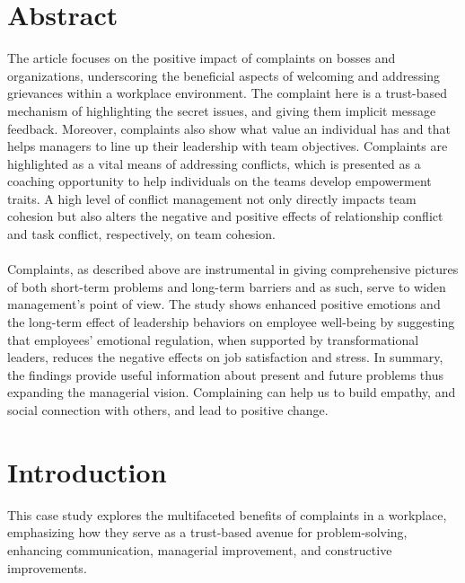 \documentclass[a4paper,12pt]{article}
\begin{document}
\section*{Abstract}
The article focuses on the positive impact of complaints on bosses and organizations, underscoring the beneficial aspects of welcoming and addressing grievances within a workplace environment. The complaint here is a trust-based mechanism of highlighting the secret issues, and giving them implicit message feedback. Moreover, complaints also show what value an individual has and that helps managers to line up their leadership with team objectives. Complaints are highlighted as a vital means of addressing conflicts, which is presented as a coaching opportunity to help individuals on the teams develop empowerment traits. A high level of conflict management not only directly impacts team cohesion but also alters the negative and positive effects of relationship conflict and task conflict, respectively, on team cohesion.
\\\\
Complaints, as described above are instrumental in giving comprehensive pictures of both short-term problems and long-term barriers and as such, serve to widen management's point of view. The study shows enhanced positive emotions and the long-term effect of leadership behaviors on employee well-being by suggesting that employees' emotional regulation, when supported by transformational leaders, reduces the negative effects on job satisfaction and stress. In summary, the findings provide useful information about present and future problems thus expanding the managerial vision. Complaining can help us to build empathy, and social connection with others, and lead to positive change.
\newpage
\section{Introduction}
This case study explores the multifaceted benefits of complaints in a workplace, emphasizing how they serve as a trust-based avenue for problem-solving, enhancing communication, managerial improvement, and constructive improvements.
\end{document}
